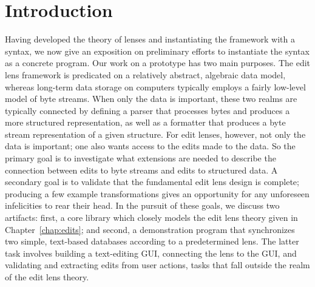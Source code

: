 \section{Introduction}
\label{sec:impl-intro}
Having developed the theory of lenses and instantiating the framework with a
syntax, we now give an exposition on preliminary efforts to instantiate the
syntax as a concrete program. Our work on a prototype has two main purposes.
The edit lens framework is predicated on a relatively abstract, algebraic
data model, whereas long-term data storage on computers typically employs a
fairly low-level model of byte streams. When only the data is important,
these two realms are typically connected by defining a parser that processes
bytes and produces a more structured representation, as well as a formatter
that produces a byte stream representation of a given structure. For edit
lenses, however, not only the data is important; one also wants access to
the edits made to the data. So the primary goal is to investigate what
extensions are needed to describe the connection between edits to byte
streams and edits to structured data. A secondary goal is to validate that
the fundamental edit lens design is complete; producing a few example
transformations gives an opportunity for any unforeseen infelicities to rear
their head. In the pursuit of these goals, we discuss two artifacts: first,
a core library which closely models the edit lens theory given in
Chapter~\ref{chap:edits}; and second, a demonstration program that
synchronizes two simple, text-based databases according to a predetermined
lens. The latter task involves building a text-editing GUI, connecting the
lens to the GUI, and validating and extracting edits from user actions,
tasks that fall outside the realm of the edit lens theory.

